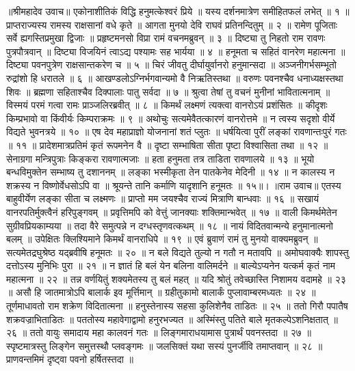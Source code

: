 ॥श्रीमहादेव उवाच॥
एकोनाशीतिकं विद्धि हनुमत्केश्वरं प्रिये ॥
यस्य दर्शनमात्रेण समीहितफलं लभेत् ॥ १ ॥
प्राप्तराज्यस्य रामस्य राक्षसानां वधे कृते ॥
आगता मुनयो देवि राघवं प्रतिनन्दितुम् ॥ २ ॥
रामेण पूजिताः सर्वे ह्यगस्तिप्रमुखा द्विजाः ॥
प्रहृष्टमनसो विप्रा रामं वचनमब्रुवन् ॥ ३ ॥
दिष्ट्या तु निहतो राम रावणः पुत्रपौत्रवान् ॥
दिष्ट्या विजयिनं त्वाऽद्य पश्यामः सह भार्यया ॥ ४ ॥
हनूमता च सहितं वानरेण महात्मना ॥
दिष्ट्या पवनपुत्रेण राक्षसान्तकरेण च ॥ ५ ॥
चिरं जीवतु दीर्घायुर्वानरो हनुमान्सदा ॥
अञ्जनीगर्भसम्भूतो रुद्रांशो हि धरातले ॥ ६ ॥
आखण्डलोऽग्निर्भगवान्यमो वै निऋतिस्तथा ॥
वरुणः पवनश्चैव धनाध्यक्षस्तथा शिवः ॥
ब्रह्मणा सहिताश्चैव दिक्पालाः पातु सर्वदा ॥ ७ ॥
श्रुत्वा तेषां तु वचनं मुनीनां भावितात्मनाम् ॥
विस्मयं परमं गत्वा रामः प्राञ्जलिरब्रवीत् ॥ ८ ॥
किमर्थं लक्ष्मणं त्यक्त्वा वानरोऽयं प्रशंसितः ॥
कीदृशः किम्प्रभावो वा किंवीर्यः किम्पराक्रमः ॥ ९ ॥
अथोचुः सत्यमेवैतत्कारणं वानरोत्तमे ॥
न त्वस्य सदृशो वीर्ये विद्यते भुवनत्रये ॥ १० ॥
एष देव महाप्राज्ञो योजनानां शतं प्लुतः ॥
धर्षयित्वा पुरीं लङ्कां रावणान्तःपुरं गतः ॥ ११ ॥
प्रादेशमात्रप्रतिमं कृतं रूपमनेन वै ॥
दृष्टा सम्भाषिता सीता पृष्टा विश्वासिता तथा ॥ १२ ॥
सेनाग्रगा मन्त्रिपुत्राः किङ्करा रावणात्मजाः ॥
हता हनुमता तत्र ताडिता रावणालये ॥ १३ ॥
भूयो बन्धविमुक्तेन सम्भाष्य तु दशाननम् ॥
लङ्का भस्मीकृता तेन पातकेनेव मेदिनी ॥ १४ ॥
न कालस्य न शक्रस्य न विष्णोर्वेधसोऽपि वा ॥
श्रूयन्ते तानि कर्माणि यादृशानि हनूमतः ॥ १५॥।
॥राम उवाच॥
एतस्य बाहुवीर्येण लङ्का सीता च लक्ष्मणः ॥
प्राप्तो मम जयश्चैव राज्यं मित्राणि बान्धवाः ॥ १६ ॥
सखायं वानरपतिर्मुक्त्वैनं हरिपुङ्गवम् ॥
प्रवृत्तिमपि को वेत्तुं जानक्याः शक्तिमान्भवेत् ॥ १७ ॥
वाली किमर्थमेतेन सुग्रीवप्रियकाम्यया ॥
तदा वैरे समुत्पन्ने न दग्धस्तृणवत्कथम् ॥ १८ ॥
नायं विदितवान्मन्ये हनुमानात्मनो बलम् ॥
उपेक्षितः क्लिश्यिमाने किमर्थं वानराधिपे ॥ १९ ॥
एवं ब्रुवाणं रामं तु मुनयो वाक्यमब्रुवन् ॥
सत्यमेतद्रघुश्रेष्ठ यद्ब्रवीषि हनूमतः ॥ २० ॥
न बले विद्यते तुल्यो न गतौ न मतावपि ॥
अमोघवाक्यैः शापस्तु दत्तोऽस्य मुनिभिः पुरा ॥ २१ ॥
न ज्ञातं हि बलं येन बलिना वालिमर्दने ॥
बाल्येऽप्यनेन यत्कर्म कृतं नाम महात्मना ॥ २२ ॥
तन्न वर्णयितुं शक्यमेतस्य तु बलं महत् ॥
यदि श्रोतुं तवेच्छास्ति निशामय वदामहे ॥ २३ ॥
असौ हि जातमात्रोऽपि बालार्क इव मूर्त्तिमान् ॥
ग्रहीतुकामो बालार्कं पुप्लावाम्बरमध्यतः ॥ २४ ॥
तूर्णमाधावतो राम शक्रेण विदितात्मना ॥
हनुस्तेनास्य सहसा कुलिशेनैव ताडितः ॥ २५ ॥
ततो गिरौ पपातैष शक्रवज्राभिताडितः ॥
पततोस्य महावेगाद्वामो हनुरभज्यत ॥
अस्मिंस्तु पतिते बाले मृतकल्पेऽशनिक्षतात् ॥ २६ ॥
ततो वायुः समादाय महा कालवनं गतः ॥
लिङ्गमाराधयामास पुत्रार्थं पवनस्तदा ॥ २७ ॥
स्पृष्टमात्रस्तु लिङ्गेन समुत्तस्थौ प्लवङ्गमः ॥
जलसिक्तं यथा सस्यं पुनर्जीवि तमाप्तवान् ॥ २८ ॥
प्राणवन्तमिमं दृष्ट्वा पवनो हर्षितस्तदा ॥

